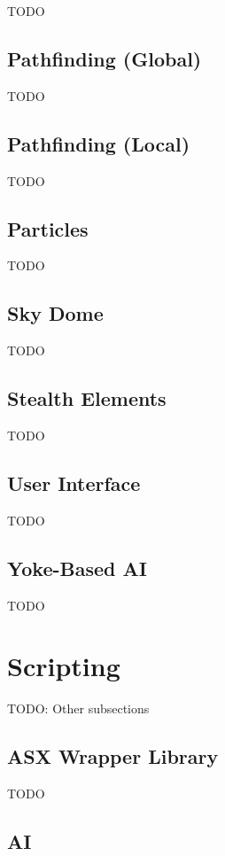 TODO

\subsection{Pathfinding (Global)}

TODO

\subsection{Pathfinding (Local)}

TODO

\subsection{Particles}

TODO

\subsection{Sky Dome}

TODO

\subsection{Stealth Elements}

TODO

\subsection{User Interface}

TODO

\subsection{Yoke-Based AI}

TODO

\section{Scripting}

TODO: Other subsections

\subsection{ASX Wrapper Library}

TODO

\subsection{AI}

